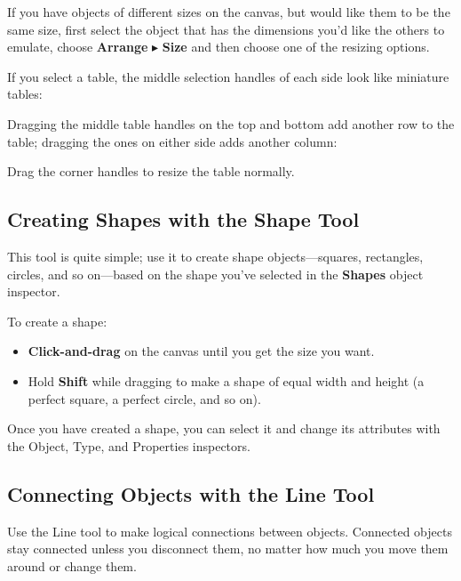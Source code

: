 \documentclass[../main.tex]{subfiles}
\begin{document}

If you have objects of different sizes on the canvas, but would like them to be the same size,
first select the object that has the dimensions you'd like the others to emulate, choose
\textbf{Arrange} $\blacktriangleright$ \textbf{Size} and then choose one of the resizing
options.

If you select a table, the middle selection handles of each side look like miniature tables:


Dragging the middle table handles on the top and bottom add another row to the table; dragging
the ones on either side adds another column:


Drag the corner handles to resize the table normally.

\subsection{ Creating Shapes with the Shape Tool}

This tool is quite simple; use it to create shape objects---squares, rectangles, circles, and so
on---based on the shape you've selected in the \textbf{Shapes} object inspector.

To create a shape:

\begin{itemize}
  \item \textbf{Click-and-drag} on the canvas until you get the size you want.
  \item Hold \textbf{Shift} while dragging to make a shape of equal width and height (a perfect
    square, a perfect circle, and so on).
\end{itemize}

Once you have created a shape, you can select it and change its attributes with the Object,
Type, and Properties inspectors.

\subsection{ Connecting Objects with the Line Tool}

Use the Line tool to make logical connections between objects. Connected objects stay connected
unless you disconnect them, no matter how much you move them around or change them.
\end{document}
